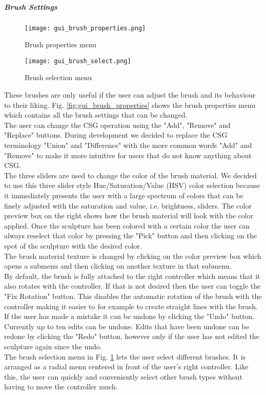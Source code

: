 \subparagraph{Brush Settings}

\begin{figure}[!htb]
\texttt{[image: gui\_brush\_properties.png]}
\caption{Brush properties menu}
\label{fig:gui_brush_properties}
\endminipage\hfill
{}
\texttt{[image: gui\_brush\_select.png]}
\caption{Brush selection menu}
\label{fig:gui_brush_select}
\endminipage\hfill
\end{figure}

These brushes are only useful if the user can adjust the brush and its behaviour to their liking. Fig. \ref{fig:gui_brush_properties} shows the brush properties menu which contains all the brush settings that can be changed.\\
The user can change the CSG operation using the "Add", "Remove" and "Replace" buttons. During development we decided to replace the CSG terminology "Union" and "Difference" with the more common words "Add" and "Remove" to make it more intuitive for users that do not know anything about CSG.\\
The three sliders are used to change the color of the brush material. We decided to use this three slider style Hue/Saturation/Value (HSV) color selection because it immediately presents the user with a large spectrum of colors that can be finely adjusted with the saturation and value, i.e. brightness, sliders. The color preview box on the right shows how the brush material will look with the color applied. Once the sculpture has been colored with a certain color the user can always reselect that color by pressing the "Pick" button and then clicking on the spot of the sculpture with the desired color.\\
The brush material texture is changed by clicking on the color preview box which opens a submenu and then clicking on another texture in that submenu.\\
By default, the brush is fully attached to the right controller which means that it also rotates with the controller. If that is not desired then the user can toggle the
"Fix Rotation" button. This disables the automatic rotation of the brush with the controller making it easier to for example to create straight lines with the brush.\\
If the user has made a mistake it can be undone by clicking the "Undo" button. Currently up to ten edits can be undone. Edits that have been undone can be redone by clicking the "Redo" button, however only if the user has not edited the sculpture again since the undo.\\
The brush selection menu in Fig. \ref{fig:gui_brush_select} lets the user select different brushes. It is arranged as a radial menu centered in front of the user's right controller. Like this, the user can quickly and conveniently select other brush types without having to move the controller much.

